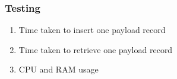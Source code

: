 \documentclass[11pt,openright]{report}
\begin{document}
\subsubsection{Testing}
\begin{enumerate}
    \item Time taken to insert one payload record
    \item Time taken to retrieve one payload record
    \item CPU and RAM usage
\end{enumerate}

\end{document}
